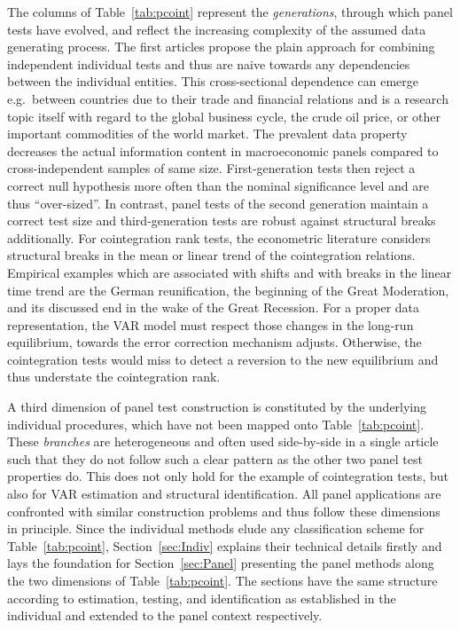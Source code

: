 The columns of Table~\ref{tab:pcoint} represent the \textit{generations}, through which panel tests have evolved, and reflect the increasing complexity of the assumed data generating process. The first articles propose the plain approach for combining independent individual tests and thus are naive towards any dependencies between the individual entities. This cross-sectional dependence can emerge e.g.~between countries due to their trade and financial relations and is a research topic itself with regard to the global business cycle, the crude oil price, or other important commodities of the world market. The prevalent data property decreases the actual information content in macroeconomic panels compared to cross-independent samples of same size. First-generation tests then reject a correct null hypothesis more often than the nominal significance level and are thus ``over-sized''. In contrast, panel tests of the second generation maintain a correct test size and third-generation tests are robust against structural breaks additionally. For cointegration rank tests, the econometric literature considers structural breaks in the mean or linear trend of the cointegration relations. Empirical examples which are associated with shifts and with breaks in the linear time trend are the German reunification, the beginning of the Great Moderation, and its discussed end in the wake of the Great Recession. For a proper data representation, the VAR model must respect those changes in the long-run equilibrium, towards the error correction mechanism adjusts. Otherwise, the cointegration tests would miss to detect a reversion to the new equilibrium and thus understate the cointegration rank.

A third dimension of panel test construction is constituted by the underlying individual procedures, which have not been mapped onto Table~\ref{tab:pcoint}. These \textit{branches} are heterogeneous and often used side-by-side in a single article such that they do not follow such a clear pattern as the other two panel test properties do. This does not only hold for the example of cointegration tests, but also for VAR estimation and structural identification. All panel applications are confronted with similar construction problems and thus follow these dimensions in principle. Since the individual methods elude any classification scheme for Table~\ref{tab:pcoint}, Section~\ref{sec:Indiv} explains their technical details firstly and lays the foundation for Section~\ref{sec:Panel} presenting the panel methods along the two dimensions of Table~\ref{tab:pcoint}. The sections have the same structure according to estimation, testing, and identification as established in the individual and extended to the panel context respectively.

